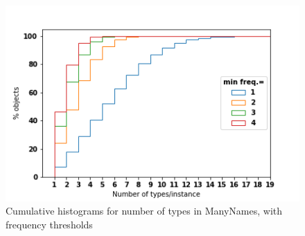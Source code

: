 %




\begin{figure}
\includegraphics[width=\columnwidth]{figures/types_instances.png}
 \caption{\label{fig:ntypes} Cumulative histograms for number of types in ManyNames, with frequency thresholds} 
\end{figure}

